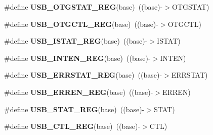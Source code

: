 \begin{DoxyCompactItemize}
\item 
\mbox{\label{group___u_s_b___register___accessor___macros_gad50d4233733a0ec8cd3f8bd835aeb9fa}} 
\#define {\bfseries U\+S\+B\+\_\+\+O\+T\+G\+S\+T\+A\+T\+\_\+\+R\+EG}(base)~((base)-\/$>$O\+T\+G\+S\+T\+AT)
\item 
\mbox{\label{group___u_s_b___register___accessor___macros_ga173b94208c5770ddcb9f9fb76c77d6a6}} 
\#define {\bfseries U\+S\+B\+\_\+\+O\+T\+G\+C\+T\+L\+\_\+\+R\+EG}(base)~((base)-\/$>$O\+T\+G\+C\+TL)
\item 
\mbox{\label{group___u_s_b___register___accessor___macros_ga0f24e60354c45e02ee9702596e4a5878}} 
\#define {\bfseries U\+S\+B\+\_\+\+I\+S\+T\+A\+T\+\_\+\+R\+EG}(base)~((base)-\/$>$I\+S\+T\+AT)
\item 
\mbox{\label{group___u_s_b___register___accessor___macros_ga8edd1b1424a6e18f6fe2cd1cbfb886ba}} 
\#define {\bfseries U\+S\+B\+\_\+\+I\+N\+T\+E\+N\+\_\+\+R\+EG}(base)~((base)-\/$>$I\+N\+T\+EN)
\item 
\mbox{\label{group___u_s_b___register___accessor___macros_ga5dcfe1e668621d53983d793d1a2f8abd}} 
\#define {\bfseries U\+S\+B\+\_\+\+E\+R\+R\+S\+T\+A\+T\+\_\+\+R\+EG}(base)~((base)-\/$>$E\+R\+R\+S\+T\+AT)
\item 
\mbox{\label{group___u_s_b___register___accessor___macros_ga8128051a5240f8bc046e31d405c67947}} 
\#define {\bfseries U\+S\+B\+\_\+\+E\+R\+R\+E\+N\+\_\+\+R\+EG}(base)~((base)-\/$>$E\+R\+R\+EN)
\item 
\mbox{\label{group___u_s_b___register___accessor___macros_ga7c8ccd47cc8588700bdbd358f4c8e33f}} 
\#define {\bfseries U\+S\+B\+\_\+\+S\+T\+A\+T\+\_\+\+R\+EG}(base)~((base)-\/$>$S\+T\+AT)
\item 
\mbox{\label{group___u_s_b___register___accessor___macros_gaf84a262dc6242d1a0f3b47186de660e7}} 
\#define {\bfseries U\+S\+B\+\_\+\+C\+T\+L\+\_\+\+R\+EG}(base)~((base)-\/$>$C\+TL)

\end{DoxyCompactItemize}
